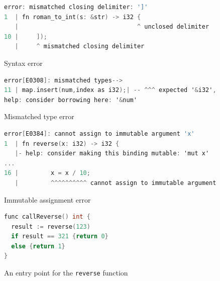 \documentclass[12pt,openany,oneside,table]{cmuthesis}
\begin{document}
\begin{figure}[t]
\centering
    \begin{lstlisting}[numbersep=5pt,xleftmargin=21pt,numberstyle=\scriptsize,basicstyle=\footnotesize\ttfamily,firstnumber=1, language=C]
error: mismatched closing delimiter: ']'
1  | fn roman_to_int(s: &str) -> i32 {
   |                                 ^ unclosed delimiter
10 |     ]);
   |     ^ mismatched closing delimiter
\end{lstlisting}
\vspace*{-2mm}
\caption{\small Syntax error}
\label{code:error1}
\end{figure}

\begin{figure}[t]
\centering
\begin{lstlisting}[numbersep=5pt,xleftmargin=21pt,numberstyle=\scriptsize,basicstyle=\footnotesize\ttfamily,firstnumber=1, language=C, language=C]
error[E0308]: mismatched types-->
11 | map.insert(num,index as i32);| -- ^^^ expected '&i32', found i32
help: consider borrowing here: '&num'
\end{lstlisting}
\vspace*{-2mm}
\caption{\small Mismatched type error}
\label{code:error2}
\end{figure}

\begin{figure}[t]
\centering
\begin{lstlisting}[numbersep=5pt,xleftmargin=21pt,numberstyle=\scriptsize,basicstyle=\footnotesize\ttfamily,firstnumber=1, language=C]
error[E0384]: cannot assign to immutable argument 'x'
1  | fn reverse(x: i32) -> i32 {
   |- help: consider making this binding mutable: 'mut x'
...
16 |         x = x / 10;
   |         ^^^^^^^^^^ cannot assign to immutable argument
\end{lstlisting}
\vspace*{-2mm}
\caption{\small Immutable assignment error}
\label{code:error3}
\end{figure}


\begin{figure}
\centering
\begin{lstlisting}[numbersep=5pt,xleftmargin=21pt,numberstyle=\scriptsize,basicstyle=\footnotesize\ttfamily,firstnumber=1, language=C]
func callReverse() int {
  result := reverse(123)
  if result == 321 {return 0} 
  else {return 1}
}
\end{lstlisting}
\vspace*{-2mm}
\caption{\small An entry point for the {\tt reverse} function}
\label{code:gotestreverse}
\end{figure}
\end{document}
